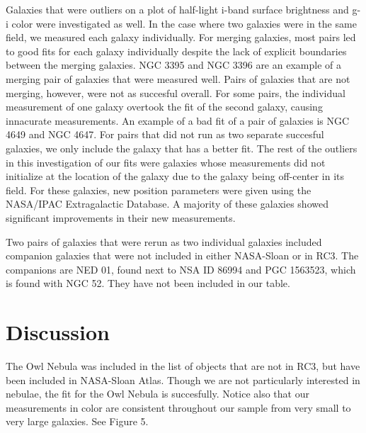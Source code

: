 \documentclass[12pt,preprint,pdftex]{aastex}
\begin{document}
Galaxies that were outliers on a plot of half-light i-band surface brightness and g-i color were investigated as well. In the case where two galaxies were in the same field, we measured each galaxy individually. For merging galaxies, most pairs led to good fits for each galaxy individually despite the lack of explicit boundaries between the merging galaxies. NGC 3395 and NGC 3396 are an example of a merging pair of galaxies that were measured well. Pairs of galaxies that are not merging, however, were not as succesful overall. For some pairs, the individual measurement of one galaxy overtook the fit of the second galaxy, causing innacurate measurements. An example of a bad fit of a pair of galaxies is NGC 4649 and NGC 4647. For pairs that did not run as two separate succesful galaxies, we only include the galaxy that has a better fit. The rest of the outliers in this investigation of our fits were galaxies whose measurements did not initialize at the location of the galaxy due to the galaxy being off-center in its field. For these galaxies, new position parameters were given using the NASA/IPAC Extragalactic Database. A majority of these galaxies showed significant improvements in their new measurements. 

Two pairs of galaxies that were rerun as two individual galaxies included companion galaxies that were not included in either NASA-Sloan or in RC3. The companions are NED 01, found next to NSA ID 86994 and PGC 1563523, which is found with NGC 52. They have not been included in our table. 



\section{Discussion}

The Owl Nebula was included in the list of objects that are not in RC3, but have been included in NASA-Sloan Atlas. Though we are not particularly interested in nebulae, the fit for the Owl Nebula is succesfully. Notice also that our measurements in color are consistent throughout our sample from very small to very large galaxies. See Figure 5. 

\end{document}
